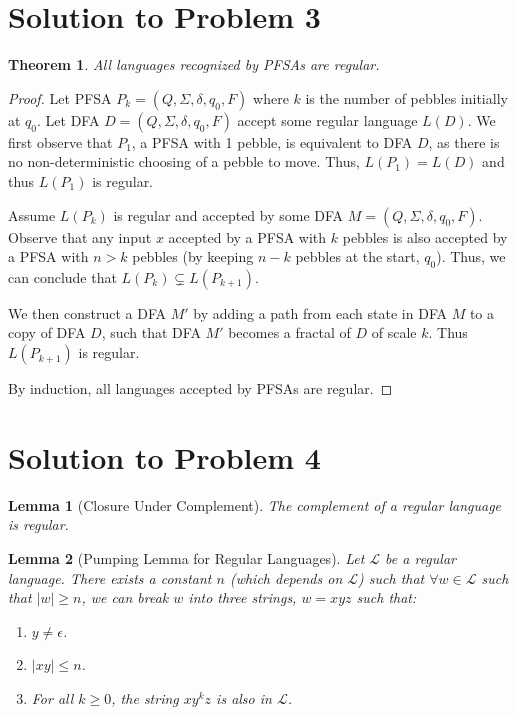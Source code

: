 \documentclass[11pt]{report}
\newcounter{problem}
\theoremstyle{definition}
\theoremstyle{plain}
\newtheorem{lemma}{Lemma}[problem]
\theoremstyle{plain}
\newtheorem{theorem*}{Theorem}
\begin{document}
\pagebreak

\section*{Solution to Problem 3}

\begin{theorem*}
All languages recognized by PFSAs are regular.
\end{theorem*}

\begin{proof}
Let PFSA $P_{k} = (Q, \Sigma, \delta, q_{0}, F)$ where $k$ is the number of pebbles initially at $q_{0}$.
Let DFA $D = (Q,\Sigma,\delta,q_{0},F)$ accept some regular language $L(D)$. 
We first observe that $P_1$, a PFSA with 1 pebble, is equivalent to DFA $D$,
as there is no non-deterministic choosing of a pebble to move.
Thus, $L(P_{1})=L(D)$ and thus $L(P_{1})$ is regular.\newline

\noindent Assume $L(P_{k})$ is regular and accepted by some DFA $M= (Q, \Sigma, \delta, q_{0}, F)$.
Observe that any input $x$ accepted by a PFSA with $k$ pebbles is also accepted by a PFSA with $n>k$ pebbles
(by keeping $n-k$ pebbles at the start, $q_{0}$). Thus, we can conclude that $L(P_{k}) \subsetneq L(P_{k+1})$.

\noindent We then construct a DFA $M'$ by adding a path from each state in DFA $M$ to a copy of DFA $D$,
such that DFA $M'$ becomes a fractal of $D$ of scale $k$. Thus $L(P_{k+1})$ is regular. \newline

\noindent By induction, all languages accepted by PFSAs are regular.
\end{proof}

\pagebreak

\section*{Solution to Problem 4}

\begin{lemma}[Closure Under Complement]
The complement of a regular language is regular.
\end{lemma}

\begin{lemma}[Pumping Lemma for Regular Languages]
Let $\mathcal{L}$ be a regular language. 
There exists a constant $n$ (which depends on $\mathcal{L}$) 
such that $\forall w \in \mathcal{L}$ such that $|w| \geq n$,
we can break $w$ into three strings, $w=xyz$ such that:
\begin{enumerate}
\item $y \neq \epsilon$.
\item $|xy| \leq n$.
\item For all $k \geq 0$, the string $xy^{k}z$ is also in $\mathcal{L}$.
\end{enumerate}
\end{lemma}
\end{document}
